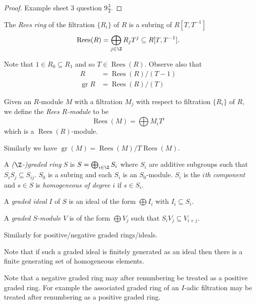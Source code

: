 \documentclass[a4paper]{article}
\DeclareMathOperator{\gr}{gr} %
\DeclareMathOperator{\Rees}{Rees} %
\begin{document}
\begin{proof}
  Example sheet 3 question \(9 \frac{3}{4}\).
\end{proof}

\begin{definition}
  The \emph{Rees ring} of the filtration \(\{R_i\}\) of \(R\) is a subring of \(R[T, T^{-1}]\)
  \[
    \Rees(R) = \bigoplus_{j \in \Z} R_j T^j \subseteq R[T, T^{-1}].
  \]
\end{definition}

Note that \(1 \in R_0 \subseteq R_1\) and so \(T \in \Rees(R)\). Observe also that
\begin{align*}
  R &= \Rees (R)/(T - 1) \\
  \gr R &= \Rees (R)/(T)
\end{align*}

\begin{definition}
  Given an \(R\)-module \(M\) with a filtration \(M_j\) with respect to filtration \(\{R_i\}\) of \(R\), we define the \emph{Rees \(R\)-module} to be
  \[
    \Rees(M) = \bigoplus M_i T^i
  \]
  which is a \(\Rees(R)\)-module.
\end{definition}

Similarly we have \(\gr(M) = \Rees(M)/T\Rees(M)\).

\begin{definition}
  A \emph{(\(\Z\)-)graded ring} \(S\) is \(S = \bigoplus_{i \in \Z} S_i\) where \(S_i\) are additive subgroups such that \(S_i S_j \subseteq S_{ij}\). \(S_0\) is a subring and each \(S_i\) is an \(S_0\)-module. \(S_i\) is the \emph{\(i\)th component} and \(s \in S\) is \emph{homogeneous of degree \(i\)} if \(s \in S_i\).

  A \emph{graded ideal} \(I\) of \(S\) is an ideal of the form \(\bigoplus I_i\) with \(I_i \subseteq S_i\).

  A \emph{graded \(S\)-module} \(V\) is of the form \(\bigoplus V_j\) such that \(S_i V_j \subseteq V_{i + j}\).

  Similarly for positive/negative graded rings/ideals.
\end{definition}

Note that if such a graded ideal is finitely generated as an ideal then there is a finite generating set of homogeneous elements.

Note that a negative graded ring may after renumbering be treated as a positive graded ring. For example the associated graded ring of an \(I\)-adic filtration may be treated after renumbering as a positive graded ring.
\end{document}
